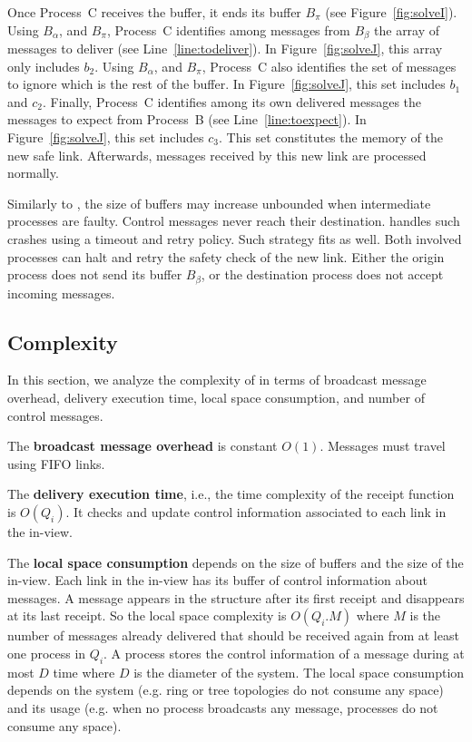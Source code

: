 \noindent Once Process~C receives the buffer, it ends its buffer $B_\pi$ (see
Figure~\ref{fig:solveI}). Using $B_\alpha$, and $B_\pi$, Process~C identifies
among messages from $B_\beta$ the array of messages to deliver (see
Line~\ref{line:todeliver}). In Figure~\ref{fig:solveJ}, this array only includes
$b_2$.  Using $B_\alpha$, and $B_\pi$, Process~C also identifies the set of
messages to ignore which is the rest of the buffer. In Figure~\ref{fig:solveJ},
this set includes $b_1$ and $c_2$. Finally, Process~C identifies among its own
delivered messages the messages to expect from Process~B (see
Line~\ref{line:toexpect}). In Figure~\ref{fig:solveJ}, this set includes $c_3$.
This set constitutes the memory of the new safe link.  Afterwards, messages
received by this new link are processed normally.




Similarly to \PCBROADCAST, the size of buffers may increase unbounded when
intermediate processes are faulty. Control messages never reach their
destination. \PCBROADCAST handles such crashes using a timeout and retry
policy. Such strategy fits \RPCBROADCAST as well. Both involved processes can
halt and retry the safety check of the new link. Either the origin process does
not send its buffer $B_\beta$, or the destination process does not accept
incoming messages. 

\subsection{Complexity}
\label{subsec:complexity}

In this section, we analyze the complexity of \RPCBROADCAST in terms of
broadcast message overhead, delivery execution time, local space consumption,
and number of control messages. 

\noindent The \textbf{broadcast message overhead} is constant $O(1)$. Messages
must travel using FIFO links.

\noindent The \textbf{delivery execution time}, i.e., the time complexity of the
receipt function is $O(Q_i)$. It checks and update control information
associated to each link in the in-view.

\noindent The \textbf{local space consumption} depends on the size of buffers
and the size of the in-view. Each link in the in-view has its buffer of control
information about messages. A message appears in the structure after its first
receipt and disappears at its last receipt. So the local space complexity is
$O(Q_i.M)$ where $M$ is the number of messages already delivered that should be
received again from at least one process in $Q_i$. A process stores the control
information of a message during at most $D$ time where $D$ is the diameter of
the system. The local space consumption depends on the system (e.g. ring or tree
topologies do not consume any space) and its usage (e.g. when no process
broadcasts any message, processes do not consume any space).

